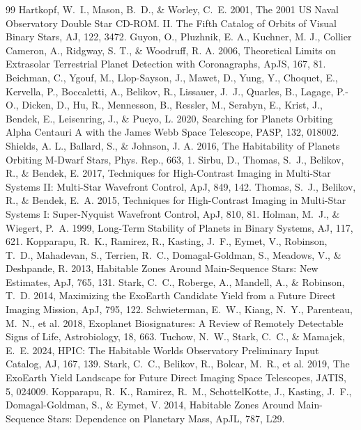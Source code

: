 \begin{thebibliography}{99}
 Hartkopf, W.~I., Mason, B.~D., \& Worley, C.~E. 2001, The 2001 US Naval Observatory Double Star CD-ROM. II. The Fifth Catalog of Orbits of Visual Binary Stars, AJ, 122, 3472.
 Guyon, O., Pluzhnik, E. A., Kuchner, M. J., Collier Cameron, A., Ridgway, S. T., \& Woodruff, R. A. 2006, Theoretical Limits on Extrasolar Terrestrial Planet Detection with Coronagraphs, ApJS, 167, 81.
 Beichman, C., Ygouf, M., Llop-Sayson, J., Mawet, D., Yung, Y., Choquet, E., Kervella, P., Boccaletti, A.,
Belikov, R., Lissauer, J.~J., Quarles, B., Lagage, P.-O., Dicken, D., Hu, R., Mennesson, B., Ressler, M., Serabyn, E., Krist, J., Bendek, E., Leisenring, J., \& Pueyo, L. 2020, Searching for Planets Orbiting Alpha Centauri A with the James Webb Space Telescope,
PASP, 132, 018002.
 Shields, A. L., Ballard, S., \& Johnson, J. A. 2016, The Habitability of Planets Orbiting M-Dwarf Stars,
Phys. Rep., 663, 1.
 Sirbu, D., Thomas, S.~J., Belikov, R., \& Bendek, E. 2017, Techniques for High-Contrast Imaging in Multi-Star Systems II: Multi-Star Wavefront Control, ApJ, 849, 142.
 Thomas, S.~J., Belikov, R., \& Bendek, E.~A. 2015, Techniques for High-Contrast Imaging in Multi-Star Systems I: Super-Nyquist Wavefront Control, ApJ, 810, 81.
 Holman, M.~J., \& Wiegert, P.~A. 1999, Long-Term Stability of Planets in Binary Systems, AJ, 117, 621.
 Kopparapu, R.~K., Ramirez, R., Kasting, J.~F., Eymet, V., Robinson, T.~D., Mahadevan, S., Terrien, R.~C., Domagal-Goldman, S., Meadows, V., \& Deshpande, R. 2013, Habitable Zones Around Main-Sequence Stars: New Estimates, ApJ, 765, 131.
Stark, C.~C., Roberge, A., Mandell, A., \& Robinson, T.~D. 2014,
Maximizing the ExoEarth Candidate Yield from a Future Direct Imaging Mission,
ApJ, 795, 122.
Schwieterman, E.~W., Kiang, N.~Y., Parenteau, M.~N., et al. 2018,
Exoplanet Biosignatures: A Review of Remotely Detectable Signs of Life,
Astrobiology, 18, 663.
Tuchow, N.~W., Stark, C.~C., \& Mamajek, E.~E. 2024,
HPIC: The Habitable Worlds Observatory Preliminary Input Catalog,
AJ, 167, 139.
Stark, C.~C., Belikov, R., Bolcar, M.~R., et al. 2019,
The ExoEarth Yield Landscape for Future Direct Imaging Space Telescopes,
JATIS, 5, 024009.
 Kopparapu, R.~K., Ramirez, R.~M., SchottelKotte, J., Kasting, J.~F., Domagal-Goldman, S., \& Eymet, V. 2014, Habitable Zones Around Main-Sequence Stars: Dependence on Planetary Mass, ApJL, 787, L29.

\end{thebibliography}
